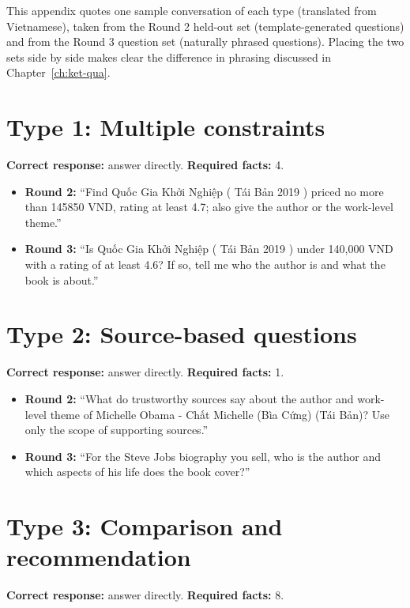 This appendix quotes one sample conversation of each type (translated from Vietnamese), taken from the Round 2 held-out set (template-generated questions) and from the Round 3 question set (naturally phrased questions). Placing the two sets side by side makes clear the difference in phrasing discussed in Chapter~\ref{ch:ket-qua}.

\section*{Type 1: Multiple constraints}

\textbf{Correct response:} answer directly. \textbf{Required facts:} 4.

\begin{itemize}
    \item \textbf{Round 2:} ``Find Quốc Gia Khởi Nghiệp ( Tái Bản 2019 ) priced no more than 145850 VND, rating at least 4.7; also give the author or the work-level theme.''
    \item \textbf{Round 3:} ``Is Quốc Gia Khởi Nghiệp ( Tái Bản 2019 ) under 140,000 VND with a rating of at least 4.6? If so, tell me who the author is and what the book is about.''
\end{itemize}

\section*{Type 2: Source-based questions}

\textbf{Correct response:} answer directly. \textbf{Required facts:} 1.

\begin{itemize}
    \item \textbf{Round 2:} ``What do trustworthy sources say about the author and work-level theme of Michelle Obama - Chất Michelle (Bìa Cứng) (Tái Bản)? Use only the scope of supporting sources.''
    \item \textbf{Round 3:} ``For the Steve Jobs biography you sell, who is the author and which aspects of his life does the book cover?''
\end{itemize}

\section*{Type 3: Comparison and recommendation}

\textbf{Correct response:} answer directly. \textbf{Required facts:} 8.

